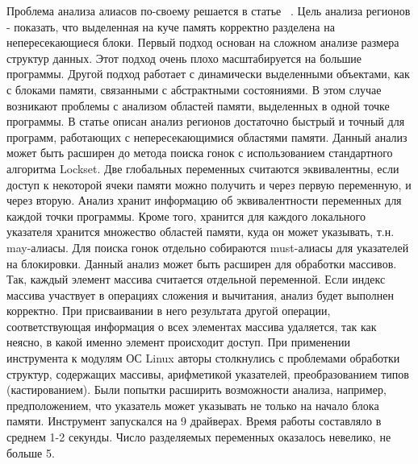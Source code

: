 Проблема анализа алиасов по-своему решается в статье ~\cite{Seidl:2009}.
Цель анализа регионов - показать, что выделенная на куче память корректно разделена на непересекающиеся блоки.  Первый подход основан на сложном анализе размера структур данных. Этот подход очень плохо масштабируется на большие программы. Другой подход работает с динамически выделенными объектами, как с блоками памяти, связанными с абстрактными состояниями. В этом случае возникают проблемы с анализом областей памяти, выделенных в одной точке программы. В статье описан анализ регионов достаточно быстрый и точный для программ, работающих с непересекающимися областями памяти. Данный анализ может быть расширен до метода поиска гонок с использованием стандартного алгоритма Lockset. 
Две глобальных переменных считаются эквивалентны, если доступ к некоторой ячеки памяти можно получить и через первую переменную, и через вторую. Анализ хранит информацию об эквивалентности переменных для каждой точки программы. Кроме того, хранится для каждого локального указателя хранится множество областей памяти, куда он может указывать, т.н. may-алиасы. Для поиска гонок отдельно собираются must-алиасы для указателей на блокировки. 
Данный анализ может быть расширен для обработки массивов. Так, каждый элемент массива считается отдельной переменной. Если индекс массива участвует в операциях сложения и вычитания, анализ будет выполнен корректно. При присваивании в него результата другой операции, соответствующая информация о всех элементах массива удаляется, так как неясно, в какой именно элемент происходит доступ. 
При применении инструмента к модулям ОС Linux авторы столкнулись с проблемами обработки структур, содержащих массивы, арифметикой указателей, преобразованием типов (кастированием). Были попытки расширить возможности анализа, например, предположением, что указатель может указывать не только на начало блока памяти. 
Инструмент запускался на 9 драйверах. Время работы составляло в среднем 1-2 секунды. Число разделяемых переменных оказалось невелико, не больше 5.

